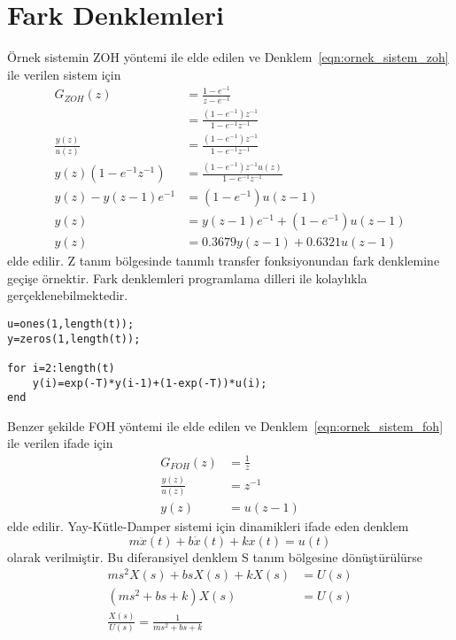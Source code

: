 \chapter{Fark Denklemleri}
Örnek sistemin ZOH yöntemi ile elde edilen ve Denklem~\ref{eqn:ornek_sistem_zoh} ile verilen sistem için
\begin{equation}
\begin{split}
    G_{ZOH}(z)&=\frac{1-e^{-1}}{z-e^{-1}}\\
    &=\frac{(1-e^{-1})z^{-1}}{1-e^{-1}z^{-1}}\\
    \frac{y(z)}{u(z)}&=\frac{(1-e^{-1})z^{-1}}{1-e^{-1}z^{-1}}\\
    y(z)(1-e^{-1}z^{-1})&=\frac{(1-e^{-1})z^{-1}u(z)}{1-e^{-1}z^{-1}}\\
    y(z)-y(z-1)e^{-1}&=(1-e^{-1})u(z-1)\\
    y(z)&=y(z-1)e^{-1}+(1-e^{-1})u(z-1)\\
    y(z)&=0.3679y(z-1)+0.6321u(z-1)
\end{split}
\end{equation}
elde edilir. Z tanım bölgesinde tanımlı transfer fonksiyonundan fark denklemine geçişe örnektir. Fark denklemleri programlama dilleri ile kolaylıkla gerçeklenebilmektedir.
\begin{lstlisting}
u=ones(1,length(t));
y=zeros(1,length(t));

for i=2:length(t)
    y(i)=exp(-T)*y(i-1)+(1-exp(-T))*u(i);
end\end{lstlisting}
Benzer şekilde FOH yöntemi ile elde edilen ve Denklem~\ref{eqn:ornek_sistem_foh} ile verilen ifade için
\begin{equation}
    \begin{split}
        G_{FOH}(z)&=\frac{1}{z}\\
        \frac{y(z)}{u(z)}&=z^{-1}\\
        y(z)&=u(z-1)
    \end{split}
\end{equation}
elde edilir.
Yay-Kütle-Damper sistemi için dinamikleri ifade eden denklem
\begin{equation}
    m\ddot{x}(t)+b\dot{x}(t)+kx(t)=u(t)\label{eqn:mass_spring_damper}
\end{equation}
olarak verilmiştir. Bu diferansiyel denklem S tanım bölgesine dönüştürülürse
\begin{equation}
\begin{split}
    ms^2X(s)+b sX(s)+kX(s)&=U(s)\\
    (ms^2+b s+k)X(s)&=U(s)\\
    \frac{X(s)}{U(s)}=\frac{1}{ms^2+b s+k}
\end{split}
\end{equation}
